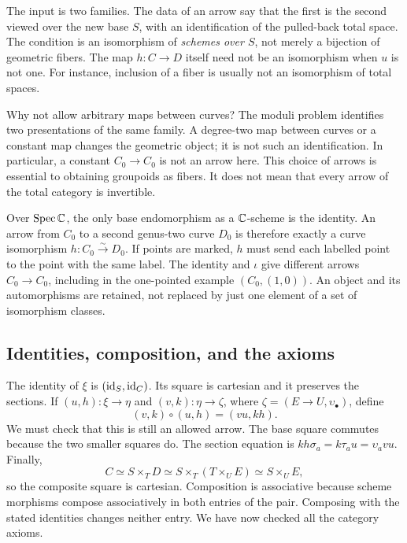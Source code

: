 The input is two families. The data of an arrow say that the first
is the second viewed over the new base $S$, with an identification
of the pulled-back total space. The condition is an isomorphism of
\emph{schemes over $S$}, not merely a bijection of geometric fibers.
The map $h:C\to D$ itself need not be an isomorphism when $u$ is
not one. For instance, inclusion of a fiber is usually not an
isomorphism of total spaces.

Why not allow arbitrary maps between curves? The moduli problem
identifies two presentations of the same family. A degree-two map
between curves or a constant map changes the geometric object; it
is not such an identification. In particular, a constant
$C_0\to C_0$ is not an arrow here. This choice of arrows is essential
to obtaining groupoids as fibers. It does not mean that every arrow
of the total category is invertible.

\begin{Ex}
Over $\operatorname{Spec}\mathbb C$, the only base endomorphism as a $\mathbb C$-scheme is
the identity. An arrow from $C_0$ to a second genus-two curve $D_0$
is therefore exactly a curve isomorphism $h:C_0\xrightarrow{\sim}D_0$.
If points are marked, $h$ must send each labelled point to the
point with the same label. The identity and $\iota$ give different
arrows $C_0\to C_0$, including in the one-pointed example $(C_0,(1,0))$.
An object and its automorphisms are retained, not replaced by just
one element of a set of isomorphism classes.
\end{Ex}

\subsection{Identities, composition, and the axioms}

The identity of $\xi$ is $(\operatorname{id}_S,\operatorname{id}_C)$. Its square is cartesian
and it preserves the sections. If $(u,h):\xi\to\eta$ and
$(v,k):\eta\to\zeta$, where $\zeta=(E\to U,\upsilon_\bullet)$,
define
\[
                        (v,k)\circ(u,h)=(vu,kh).
\]
We must check that this is still an allowed arrow. The base square
commutes because the two smaller squares do. The section equation is
$kh\sigma_a=k\tau_a u=\upsilon_a vu$. Finally,
\[
C\simeq S\times_TD
\simeq S\times_T(T\times_UE)
\simeq S\times_UE,
\]
so the composite square is cartesian. Composition is associative
because scheme morphisms compose associatively in both entries of
the pair. Composing with the stated identities changes neither
entry. We have now checked all the category axioms.

